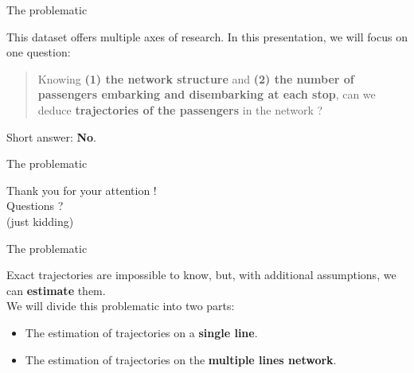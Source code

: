 \documentclass[10pt]{beamer}
\newcommand{\imp}[1]{\textbf{\color{cyan}#1}}
\begin{document}

	\begin{frame}{The problematic}
		
		This dataset offers multiple axes of research. In this presentation, we will focus on one question: \vspace{0.4cm}
		
		\begin{quotation}
			\large
			Knowing \imp{(1) the network structure} and \imp{(2) the number of passengers embarking and disembarking at each stop}, can we deduce \imp{trajectories of the passengers} in the network ?
		\end{quotation}
		
		Short answer: {\large \imp{No}}.
	\end{frame}

	
	\begin{frame}{The problematic}

		\begin{center}
			\huge Thank you for your attention ! \\
			Questions ? \\
			\vspace{1cm}
			\small
			(just kidding)
		\end{center}
		
		
	\end{frame}
	
	
	\begin{frame}{The problematic}
		
		Exact trajectories are impossible to know, but, with additional assumptions, we can \imp{estimate} them. \\
		\vspace{0.4cm}
		We will divide this problematic into two parts:
		\begin{itemize}
			\item The estimation of trajectories on a \imp{single line}.
			\item The estimation of trajectories on the \imp{multiple lines network}.
		\end{itemize}
		
	\end{frame}
	
	
\end{document}
